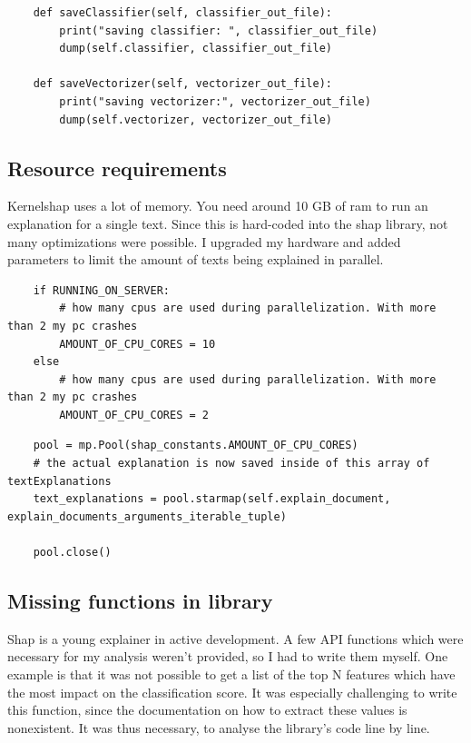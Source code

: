 \begin{lstlisting}
    def saveClassifier(self, classifier_out_file):
        print("saving classifier: ", classifier_out_file)
        dump(self.classifier, classifier_out_file)

    def saveVectorizer(self, vectorizer_out_file):
        print("saving vectorizer:", vectorizer_out_file)
        dump(self.vectorizer, vectorizer_out_file)
\end{lstlisting}

\subsection{Resource requirements}

Kernelshap uses a lot of memory. You need around 10 GB of ram to run an explanation for a single text. Since this is hard-coded into the shap library, not many optimizations were possible. I upgraded my hardware and added parameters to limit the amount of texts being explained in parallel.

\begin{lstlisting}
    if RUNNING_ON_SERVER:
        # how many cpus are used during parallelization. With more than 2 my pc crashes
        AMOUNT_OF_CPU_CORES = 10
    else
        # how many cpus are used during parallelization. With more than 2 my pc crashes
        AMOUNT_OF_CPU_CORES = 2
\end{lstlisting}

\begin{lstlisting}
    pool = mp.Pool(shap_constants.AMOUNT_OF_CPU_CORES)
    # the actual explanation is now saved inside of this array of textExplanations
    text_explanations = pool.starmap(self.explain_document, explain_documents_arguments_iterable_tuple)

    pool.close()
\end{lstlisting}

\subsection{Missing functions in library}

Shap is a young explainer in active development. A few API functions which were necessary for my analysis weren't provided, so I had to write them myself. One example is that it was not possible to get a list of the top N features which have the most impact on the classification score. It was especially challenging to write this function, since the documentation on how to extract these values is nonexistent. It was thus necessary, to analyse the library's code line by line.

